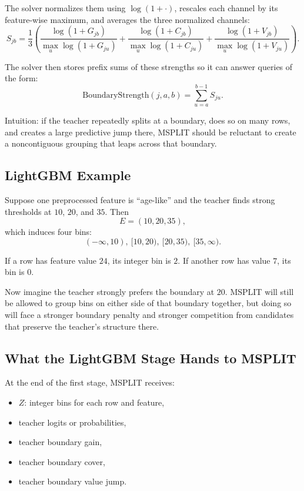 \documentclass[11pt]{article}
\begin{document}
The solver normalizes them using \(\log(1+\cdot)\), rescales each channel by its feature-wise maximum, and averages the three normalized channels:
\[
S_{jb}
=
\frac{1}{3}
\left(
\frac{\log(1+G_{jb})}{\max_u \log(1+G_{ju})}
+
\frac{\log(1+C_{jb})}{\max_u \log(1+C_{ju})}
+
\frac{\log(1+V_{jb})}{\max_u \log(1+V_{ju})}
\right).
\]

The solver then stores prefix sums of these strengths so it can answer queries of the form:
\[
\mathrm{BoundaryStrength}(j, a, b)
=
\sum_{u=a}^{b-1} S_{ju}.
\]

Intuition: if the teacher repeatedly splits at a boundary, does so on many rows, and creates a large predictive jump there, MSPLIT should be reluctant to create a noncontiguous grouping that leaps across that boundary.

\subsection{LightGBM Example}

Suppose one preprocessed feature is ``age-like'' and the teacher finds strong thresholds at \(10\), \(20\), and \(35\). Then
\[
E = (10, 20, 35),
\]
which induces four bins:
\[
(-\infty,10),\ [10,20),\ [20,35),\ [35,\infty).
\]

If a row has feature value \(24\), its integer bin is \(2\). If another row has value \(7\), its bin is \(0\).

Now imagine the teacher strongly prefers the boundary at \(20\). MSPLIT will still be allowed to group bins on either side of that boundary together, but doing so will face a stronger boundary penalty and stronger competition from candidates that preserve the teacher's structure there.

\subsection{What the LightGBM Stage Hands to MSPLIT}

At the end of the first stage, MSPLIT receives:

\begin{itemize}
\item \(Z\): integer bins for each row and feature,
\item teacher logits or probabilities,
\item teacher boundary gain,
\item teacher boundary cover,
\item teacher boundary value jump.
\end{itemize}
\end{document}
